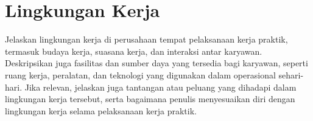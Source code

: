 \section{Lingkungan Kerja} 
\label{sec:lingkungan_kerja}
Jelaskan lingkungan kerja di perusahaan tempat pelaksanaan kerja praktik, termasuk budaya kerja, suasana kerja, dan interaksi antar karyawan.
Deskripsikan juga fasilitas dan sumber daya yang tersedia bagi karyawan, seperti ruang kerja, peralatan, dan teknologi yang digunakan dalam operasional sehari-hari.
Jika relevan, jelaskan juga tantangan atau peluang yang dihadapi dalam lingkungan kerja tersebut, serta bagaimana penulis menyesuaikan diri dengan lingkungan kerja selama pelaksanaan kerja praktik.








